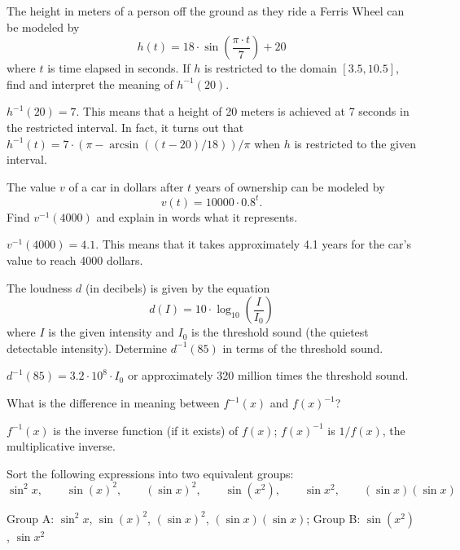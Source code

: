 \begin{exercises}
\begin{exercise}
The height in meters of a person off the ground as they ride a 
Ferris Wheel can be modeled by
\[
h(t) = 18\cdot \sin( \frac{\pi \cdot t}{7} ) + 20
\]
where $t$ is time elapsed in seconds.  If $h$ is restricted to the
domain $[3.5, 10.5]$, find and interpret the meaning of $h^{-1}(20)$.
\begin{answer}
  $h^{-1}(20)=7$.  This means that a height of 20 meters is achieved
  at 7 seconds in the restricted interval.  In fact, it turns out that
  $h^{-1}(t) = 7 \cdot (\pi - \arcsin((t-20)/18))/\pi$ when $h$ is
  restricted to the given interval.
\end{answer}
\end{exercise}

\begin{exercise}
The value $v$ of a car in dollars after $t$ years of ownership can be
modeled by
\[
v(t) = 10000\cdot 0.8^{t}.
\]
Find $v^{-1}(4000)$ and explain in words what it represents.
\begin{answer}
$v^{-1}(4000) = 4.1$.  This means that it takes approximately 4.1 years
for the car's value to reach 4000 dollars.
\end{answer}
\end{exercise}



\begin{exercise}
The loudness $d$ (in decibels) is given by the equation
\[
d(I) = 10\cdot \log_{10}\left(\frac{I}{I_0}\right)
\]
where $I$ is the given intensity and $I_0$ is the threshold sound (the
quietest detectable intensity).  Determine $d^{-1}(85)$ in terms of the
threshold sound.
\begin{answer}
$d^{-1}(85) = 3.2 \cdot 10^{8} \cdot  I_0$ or approximately 320 million times the threshold sound.
\end{answer}
\end{exercise}



\begin{exercise}
What is the difference in meaning between $f^{-1}(x)$ and $f(x)^{-1}$?
\begin{answer}
$f^{-1}(x)$ is the inverse function (if it exists) of $f(x)$;
  $f(x)^{-1}$ is $1/f(x)$, the multiplicative inverse.
\end{answer}
\end{exercise}



\begin{exercise}
Sort the following expressions into two equivalent groups:
\[
\sin^2 x, \qquad \sin(x)^2, \qquad (\sin x)^2, \qquad \sin(x^2), \qquad  \sin x^2, \qquad (\sin x)(\sin x)
\]
\begin{answer}
Group A: $\sin^2x$, $\sin(x)^2$, $(\sin x)^2$, $(\sin x)(\sin x)$;
Group B: $\sin(x^2)$, $\sin x^2$
\end{answer}
\end{exercise}


\end{exercises}
